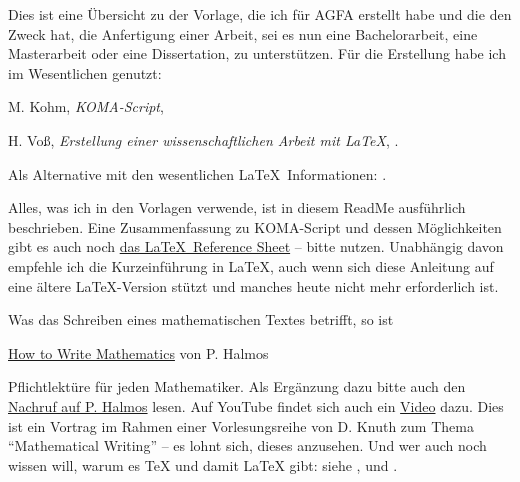 \thispagestyle{empty}
Dies ist eine Übersicht zu der Vorlage, die ich für AGFA erstellt habe und die den Zweck hat, die Anfertigung einer Arbeit, sei es nun eine Bachelorarbeit, eine Masterarbeit oder eine Dissertation, zu unterstützen.
Für die Erstellung habe ich im Wesentlichen genutzt: 
%
\begin{myitemize}[nosep]
\item
M. Kohm, \emph{KOMA-Script}, \cite{kohm:2020}   

\item
H. Voß, \emph{Erstellung einer wissenschaftlichen Arbeit mit \LaTeX{}}, \cite{voss:2021}.

\item
Als Alternative mit den wesentlichen \LaTeX\ Informationen: \textcite{schlosser:2016}.

\end{myitemize}
%
Alles, was ich in den Vorlagen verwende, ist in diesem ReadMe ausführlich beschrieben.
Eine Zusammenfassung zu KOMA-Script und dessen Möglichkeiten gibt es auch noch \href{https://ctan.org/pkg/latex-refsheet}{das \LaTeX\ Reference Sheet} -- bitte nutzen.
Unabhängig davon empfehle ich die Kurzeinführung \textcite{lshort-german} in \LaTeX{}, auch wenn sich diese Anleitung auf eine ältere \LaTeX{}-Version stützt und manches heute nicht mehr erforderlich ist.

Was das Schreiben eines mathematischen Textes betrifft, so ist
\begin{myitemize}[nosep]
\item
\href{https://sites.math.washington.edu/~lind/Resources/Halmos.pdf}{How to Write Mathematics} von P. Halmos 
\end{myitemize}
%
Pflichtlektüre für jeden Mathematiker.
Als Ergänzung dazu bitte auch den \href{https://www.ams.org/notices/200709/tx070901136p.pdf}{Nachruf auf P. Halmos} lesen.
Auf YouTube findet sich auch ein \href{https://www.youtube.com/watch?v=Cy_1JgYfKmE}{Video} dazu.
Dies ist ein Vortrag im Rahmen einer Vorlesungsreihe von D. Knuth zum Thema \enquote{Mathematical Writing} -- es lohnt sich, dieses anzusehen.
Und wer auch noch wissen will, warum es \TeX{} und damit \LaTeX{} gibt: siehe \textcite{knuth:digital}, \textcite{beeton:math} und \textcite{lamport:dmv}.

